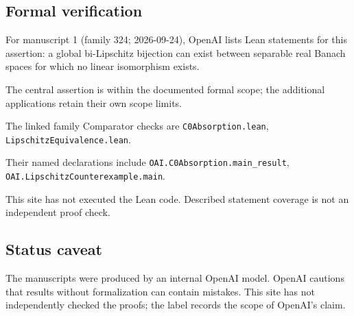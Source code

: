 \documentclass[11pt]{article}
\begin{document}
\subsection{Formal verification}
For manuscript 1 (family 324; 2026-09-24), OpenAI lists Lean statements for this assertion: a global bi-Lipschitz bijection can exist between separable real Banach spaces for which no linear isomorphism exists.

The central assertion is within the documented formal scope; the additional applications retain their own scope limits.

The linked family Comparator checks are \texttt{C0Absorption.lean}, \texttt{LipschitzEquivalence.lean}.

Their named declarations include \texttt{OAI.C0Absorption.main\_result}, \texttt{OAI.LipschitzCounterexample.main}.

This site has not executed the Lean code. Described statement coverage is not an independent proof check.

\subsection{Status caveat}
The manuscripts were produced by an internal OpenAI model. OpenAI cautions that results without formalization can contain mistakes. This site has not independently checked the proofs; the label records the scope of OpenAI's claim.
\end{document}
